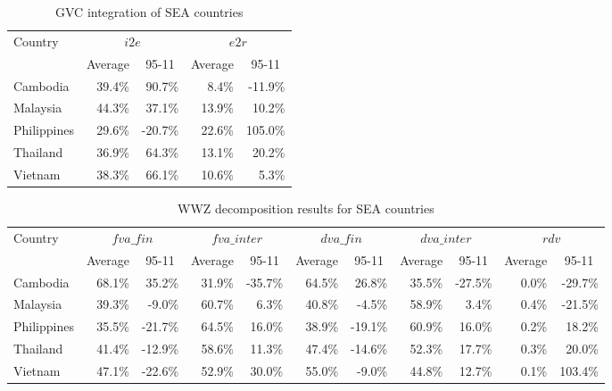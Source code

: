 \documentclass[11pt,a4paper]{article}
\begin{document}
\begin{table}[!h]\small
  \centering
  \caption{GVC integration of SEA countries}
    \begin{tabular}{lrrrr}
    \toprule
    Country & \multicolumn{2}{c}{\multirow{1}[0]{*}{$i2e$}} & \multicolumn{2}{c}{\multirow{1}[0]{*}{$e2r$}} \\
    \multicolumn{1}{c}{} & \multicolumn{1}{c}{Average} & \multicolumn{1}{c}{95-11} & \multicolumn{1}{c}{Average} & \multicolumn{1}{c}{95-11} \\
    \midrule
    Cambodia & 39.4\% & 90.7\% & 8.4\% & -11.9\% \\
    Malaysia & 44.3\% & 37.1\% & 13.9\% & 10.2\% \\
    Philippines & 29.6\% & -20.7\% & 22.6\% & 105.0\% \\
    Thailand & 36.9\% & 64.3\% & 13.1\% & 20.2\% \\
    Vietnam & 38.3\% & 66.1\% & 10.6\% & 5.3\% \\
    \bottomrule
    \end{tabular}
  \label{tab:seagvc}
\end{table}

\begin{table}[!h]\small
  \centering
  \caption{WWZ decomposition results for SEA countries}
  \hspace*{-2.7cm}
    \begin{tabular}{lrrrrrrrrrr} 
    \toprule
    \multicolumn{1}{l}{\multirow{1}[0]{*}{Country}} & \multicolumn{2}{c}{$fva\_fin$} & \multicolumn{2}{c}{$fva\_inter$} & \multicolumn{2}{c}{$dva\_fin$} & \multicolumn{2}{c}{$dva\_inter$} & \multicolumn{2}{c}{$rdv$} \\
    \multicolumn{1}{l}{} & \multicolumn{1}{c}{Average} & \multicolumn{1}{c}{95-11} &
\multicolumn{1}{c}{Average} & \multicolumn{1}{c}{95-11} & \multicolumn{1}{c}{Average} & \multicolumn{1}{c}{95-11} & \multicolumn{1}{c}{Average} & \multicolumn{1}{c}{95-11} & \multicolumn{1}{c}{Average} & \multicolumn{1}{c}{95-11} \\
  \midrule
    Cambodia & 68.1\% & 35.2\% & 31.9\% & -35.7\% & 64.5\% & 26.8\% & 35.5\% & -27.5\% & 0.0\% & -29.7\% \\
    Malaysia & 39.3\% & -9.0\% & 60.7\% & 6.3\% & 40.8\% & -4.5\% & 58.9\% & 3.4\% & 0.4\% & -21.5\% \\
    Philippines & 35.5\% & -21.7\% & 64.5\% & 16.0\% & 38.9\% & -19.1\% & 60.9\% & 16.0\% & 0.2\% & 18.2\% \\
    Thailand & 41.4\% & -12.9\% & 58.6\% & 11.3\% & 47.4\% & -14.6\% & 52.3\% & 17.7\% & 0.3\% & 20.0\% \\
    Vietnam & 47.1\% & -22.6\% & 52.9\% & 30.0\% & 55.0\% & -9.0\% & 44.8\% & 12.7\% & 0.1\% & 103.4\% \\
    \bottomrule
    \end{tabular}
  \label{tab:seawwz}
\end{table}
\end{document}
